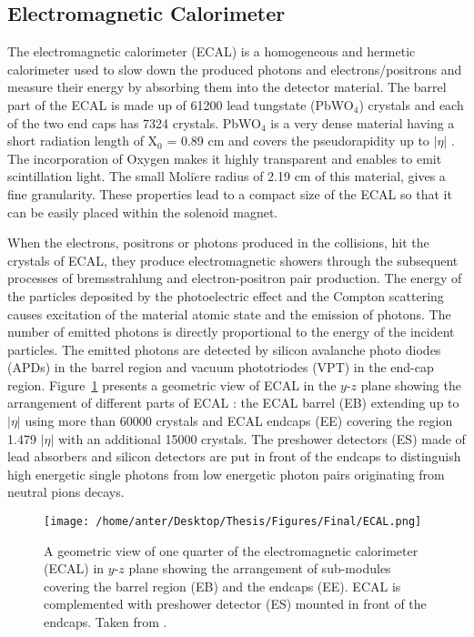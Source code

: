 \subsection{Electromagnetic Calorimeter}
The electromagnetic calorimeter (ECAL) is a homogeneous and hermetic calorimeter used to slow down the produced photons and electrons/positrons and measure their energy by absorbing them into the detector material. The barrel part of the ECAL is made up of 61200 lead tungstate (PbWO$_4$) crystals and each of the two end caps has 7324 crystals. PbWO$_4$ is a very dense material having a short radiation length of X$_0$ = 0.89 cm and covers the pseudorapidity up to $|\eta|$ . The incorporation of Oxygen makes it highly transparent and enables to emit scintillation light. The small Moli$\grave{e}$re radius of 2.19 cm of this material, gives a fine granularity. These properties lead to a compact size of the ECAL so that it can be easily placed within the solenoid magnet. 

When the electrons, positrons or photons produced in the collisions, hit the crystals of ECAL, they produce electromagnetic showers through the subsequent processes of bremsstrahlung and electron-positron pair production. The energy of the particles deposited by the photoelectric effect and the Compton scattering causes excitation of the material atomic state and the emission of photons. The number of emitted photons is directly proportional to the energy of the incident particles. The emitted photons are detected by silicon avalanche photo diodes (APDs) in the barrel region and vacuum phototriodes (VPT) in the end-cap region. Figure~\ref{fig:ecal} presents a geometric view of ECAL in the $y$-$z$ plane showing the arrangement of different parts of ECAL : the ECAL barrel (EB) extending up to $|\eta|$  using more than 60000 crystals and ECAL endcaps (EE) covering the region 1.479 \ls $|\eta|$  with an additional 15000 crystals. The preshower detectors (ES) made of lead absorbers and silicon detectors are put in front of the endcaps to distinguish high energetic single photons from low energetic photon pairs originating from neutral pions decays.

\begin{figure}[!h]
\begin{center}
\vspace*{0mm} 
\hspace*{-5mm}
\texttt{[image: /home/anter/Desktop/Thesis/Figures/Final/ECAL.png]}\\
\vspace*{0mm}
\caption[A geometric view of one quarter of the electromagnetic calorimeter (ECAL) in $y$-$z$ plane.]{A geometric view of one quarter of the electromagnetic calorimeter (ECAL) in $y$-$z$ plane showing the arrangement of sub-modules covering the barrel region (EB) and the endcaps (EE). ECAL is complemented with preshower detector (ES) mounted in front of the endcaps. Taken from \cite{Bayatian:2006nff}.}
\label{fig:ecal}
\end{center}
\end{figure}

